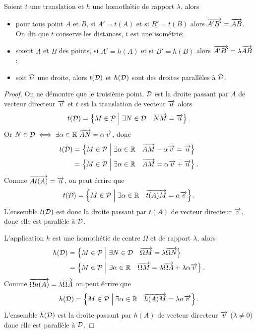 \begin{prop}
  Soient $t$ une translation et $h$ une homothétie de rapport $\lambda$, alors
  \begin{itemize}
  \item pour tous point $A$ et $B$, si $A'=t(A)$ et si $B'=t(B)$ alors $\overrightarrow{A'B'}=\overrightarrow{AB}$. On dit que $t$ conserve les distances, $t$ est une isométrie;
  \item soient $A$ et $B$ des points, si $A'=h(A)$ et si $B'=h(B)$ alors $\overrightarrow{A'B'}=\lambda\overrightarrow{AB}$;
  \item soit $\mathcal{D}$ une droite, alors $t(\mathcal{D})$ et $h(\mathcal{D})$ sont des droites parallèles à $\mathcal{D}$.
  \end{itemize}
\end{prop}
\begin{proof} On ne démontre que le troisième point. $\mathcal{D}$ est la droite passant par $A$ de vecteur directeur $\overrightarrow{v}$ et $t$ est la translation de vecteur $\overrightarrow{u}$ alors
  \begin{equation}
    t(\mathcal{D})=\left\{M \in \mathcal{P}\mathrel{}\middle|\mathrel{}\exists N \in \mathcal{D} \quad \overrightarrow{NM}=\overrightarrow{u}\right\}.
  \end{equation}
Or $N \in \mathcal{D} \iff \exists \alpha \in \mathbb{R} \ \overrightarrow{AN}=\alpha \overrightarrow{v}$, donc
\begin{align}
    t(\mathcal{D})&=\left\{M \in \mathcal{P}\mathrel{}\middle|\mathrel{}\exists \alpha \in \mathbb{R} \quad \overrightarrow{AM}-\alpha \overrightarrow{v}=\overrightarrow{u}\right\}\\
    &=\left\{M \in \mathcal{P}\mathrel{}\middle|\mathrel{}\exists \alpha \in \mathbb{R} \quad \overrightarrow{AM}=\alpha \overrightarrow{v}+\overrightarrow{u}\right\}.
  \end{align}
  Comme $\overrightarrow{At(A)}=\overrightarrow{u}$, on peut écrire que 
\begin{equation}
  t(\mathcal{D})=\left\{M \in \mathcal{P}\mathrel{}\middle|\mathrel{}\exists \alpha \in \mathbb{R} \quad \overrightarrow{t(A)M}=\alpha \overrightarrow{v}\right\}.
\end{equation}
L'ensemble $t(\mathcal{D})$ est donc la droite passant par $t(A)$ de vecteur directeur $\overrightarrow{v}$, donc elle est parallèle à $\mathcal{D}$.

L'application $h$ est une homothétie de centre $\Omega$ et de rapport $\lambda$, alors
\begin{align}
  h(\mathcal{D})&=\left\{M \in \mathcal{P}\mathrel{}\middle|\mathrel{}\exists N \in \mathcal{D} \quad \overrightarrow{\Omega M}=\lambda \overrightarrow{\Omega N}\right\}\\
    &=\left\{M \in \mathcal{P}\mathrel{}\middle|\mathrel{}\exists \alpha \in \mathbb{R} \quad \overrightarrow{\Omega M}=\lambda \overrightarrow{\Omega A}+\lambda\alpha \overrightarrow{v}\right\}.
\end{align}
Comme $\overrightarrow{\Omega h(A)}=\lambda \overrightarrow{\Omega A}$ on peut écrire que 
\begin{equation}
  h(\mathcal{D})=\left\{M \in \mathcal{P}\mathrel{}\middle|\mathrel{}\exists \alpha \in \mathbb{R} \quad \overrightarrow{h(A) M}=\lambda\alpha \overrightarrow{v}\right\}.
\end{equation}
L'ensemble $h(\mathcal{D})$ est la droite passant par $h(A)$ de vecteur directeur $\overrightarrow{v}$ ($\lambda \neq 0$) donc elle est parallèle à $\mathcal{D}$.
\end{proof}
